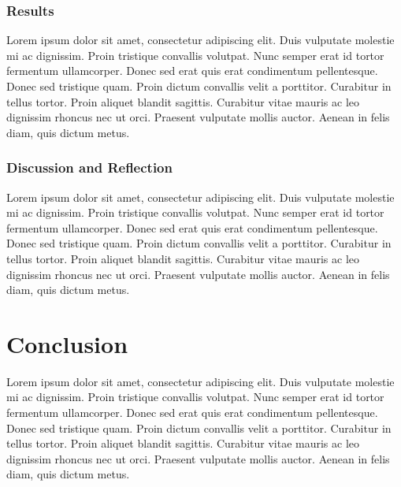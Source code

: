 \documentclass[11pt]{article}
\begin{document}
\subsubsection{Results}
Lorem ipsum dolor sit amet, consectetur adipiscing elit. Duis vulputate molestie mi ac dignissim. Proin tristique convallis volutpat. Nunc semper erat id tortor fermentum ullamcorper. Donec sed erat quis erat condimentum pellentesque. Donec sed tristique quam. Proin dictum convallis velit a porttitor. Curabitur in tellus tortor. Proin aliquet blandit sagittis. Curabitur vitae mauris ac leo dignissim rhoncus nec ut orci. Praesent vulputate mollis auctor. Aenean in felis diam, quis dictum metus.

\subsubsection{Discussion and Reflection}
Lorem ipsum dolor sit amet, consectetur adipiscing elit. Duis vulputate molestie mi ac dignissim. Proin tristique convallis volutpat. Nunc semper erat id tortor fermentum ullamcorper. Donec sed erat quis erat condimentum pellentesque. Donec sed tristique quam. Proin dictum convallis velit a porttitor. Curabitur in tellus tortor. Proin aliquet blandit sagittis. Curabitur vitae mauris ac leo dignissim rhoncus nec ut orci. Praesent vulputate mollis auctor. Aenean in felis diam, quis dictum metus.


\section{Conclusion}
Lorem ipsum dolor sit amet, consectetur adipiscing elit. Duis vulputate molestie mi ac dignissim. Proin tristique convallis volutpat. Nunc semper erat id tortor fermentum ullamcorper. Donec sed erat quis erat condimentum pellentesque. Donec sed tristique quam. Proin dictum convallis velit a porttitor. Curabitur in tellus tortor. Proin aliquet blandit sagittis. Curabitur vitae mauris ac leo dignissim rhoncus nec ut orci. Praesent vulputate mollis auctor. Aenean in felis diam, quis dictum metus.
\end{document}
